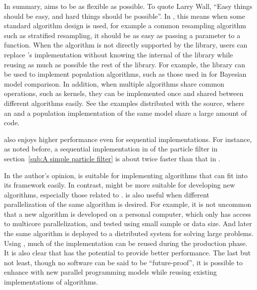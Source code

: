 \documentclass[11pt, fontset=Minion, showoverfull,
bib, mintcode, minted=cache]{marticle}
\begin{document}
In summary, \vsmc aims to be as flexible as possible. To quote Larry Wall,
``Easy things should be easy, and hard things should be possible''. In \vsmc,
this means when some standard algorithm design is used, for example a common
resampling algorithm such as stratified resampling, it should be as easy as
passing a parameter to a \vsmc function. When the algorithm is not directly
supported by the library, users can replace \vsmc's implementation without
knowing the internal of the library while reusing as much as possible the rest
of the library. For example, the library can be used to implement population
\mcmc algorithms, such as those used in \textcite{Calderhead:2009bd} for
Bayesian model comparison. In addition, when multiple algorithms share common
operations, such as \mcmc kernels, they can be implemented once and shared
between different algorithms easily. See the examples distributed with the
source, where an \smc and a population \mcmc implementation of the same \gmm
model share a large amount of code.

\vsmc also enjoys higher performance even for sequential implementations. For
instance, as noted before, a sequential implementation in \vsmc of the
particle filter in section~\ref{sub:A simple particle filter} is about twice
faster than that in \lsmctc.

In the author's opinion, \lsmctc is suitable for implementing algorithms that
can fit into its framework easily. In contrast, \vsmc might be more suitable
for developing new algorithms, especially those related to \smc. \vsmc is also
useful when different parallelization of the same algorithm is desired. For
example, it is not uncommon that a new algorithm is developed on a personal
computer, which only has access to multicore parallelization, and tested using
small sample or data size. And later the same algorithm is deployed to a
distributed system for solving large problems. Using \vsmc, much of the
implementation can be reused during the production phase. It is also clear
that \vsmc has the potential to provide better performance. The last but not
least, though no software can be said to be ``future-proof'', it is possible
to enhance \vsmc with new parallel programming models while reusing existing
implementations of algorithms.

\printbibliography[heading=reference]
\end{document}
